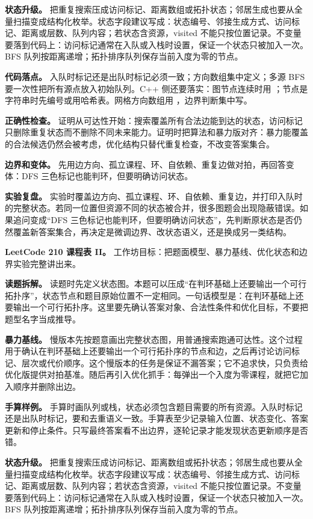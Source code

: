 \textbf{状态升级。} 把重复搜索压成访问标记、距离数组或拓扑状态；邻居生成也要从全量扫描变成结构化枚举。状态字段建议写成：状态编号、邻接生成方式、访问标记、距离或层数、队列内容；若状态含资源，visited 不能只按位置记录。不变量要落到代码上：访问标记通常在入队或入栈时设置，保证一个状态只被加入一次。BFS 队列按距离递增；拓扑排序队列保存当前入度为零的节点。

\textbf{代码落点。} 入队时标记还是出队时标记必须一致；方向数组集中定义；多源 BFS 要一次性把所有源点放入初始队列。C++ 侧还要落实：图节点连续时用 ；节点是字符串时先编号或用哈希表。网格方向数组用 ，边界判断集中写。

\textbf{正确性检查。} 证明从可达性开始：搜索覆盖所有合法边能到达的状态，访问标记只删除重复状态而不删除不同未来能力。证明时把算法和暴力版对齐：暴力能覆盖的合法候选仍然会被考虑，优化结构只替代重复检查，不改变答案集合。

\textbf{边界和变体。} 先用边方向、孤立课程、环、自依赖、重复边做对拍，再回答变体：DFS 三色标记也能判环，但要明确访问状态。

\textbf{实验复盘。} 实验时覆盖边方向、孤立课程、环、自依赖、重复边，并打印入队时的完整状态。若同一位置但资源不同的状态被合并，很多图题会出现隐蔽错误。如果追问变成“DFS 三色标记也能判环，但要明确访问状态”，先判断原状态是否仍然覆盖新答案集合，再决定是微调边界、改状态语义，还是换成另一类结构。

\noindent\textbf{LeetCode 210 课程表 II。} 工作坊目标：把题面模型、暴力基线、优化状态和边界实验完整讲出来。

\textbf{读题拆解。} 读题时先定义状态图。本题可以压成“在判环基础上还要输出一个可行拓扑序”，状态节点和题目原始位置不一定相同。一句话模型是：在判环基础上还要输出一个可行拓扑序。这里要先确认答案对象、合法性条件和优化目标，不要把题型名字当成推导。

\textbf{暴力基线。} 慢版本先按题意画出完整状态图，用普通搜索跑通可达性。这个过程用于确认在判环基础上还要输出一个可行拓扑序的节点和边，之后再讨论访问标记、层次或代价顺序。这个慢版本的任务是保证不漏答案；它不追求快，只负责给优化版提供对拍基准。随后再引入优化抓手：每弹出一个入度为零课程，就把它加入顺序并删除出边。

\textbf{手算样例。} 手算时画队列或栈，状态必须包含题目需要的所有资源。入队时标记还是出队时标记，要和去重语义一致。手算表至少记录输入位置、状态变化、答案更新和停止条件。只写最终答案看不出边界，逐轮记录才能发现状态更新顺序是否错。

\textbf{状态升级。} 把重复搜索压成访问标记、距离数组或拓扑状态；邻居生成也要从全量扫描变成结构化枚举。状态字段建议写成：状态编号、邻接生成方式、访问标记、距离或层数、队列内容；若状态含资源，visited 不能只按位置记录。不变量要落到代码上：访问标记通常在入队或入栈时设置，保证一个状态只被加入一次。BFS 队列按距离递增；拓扑排序队列保存当前入度为零的节点。

